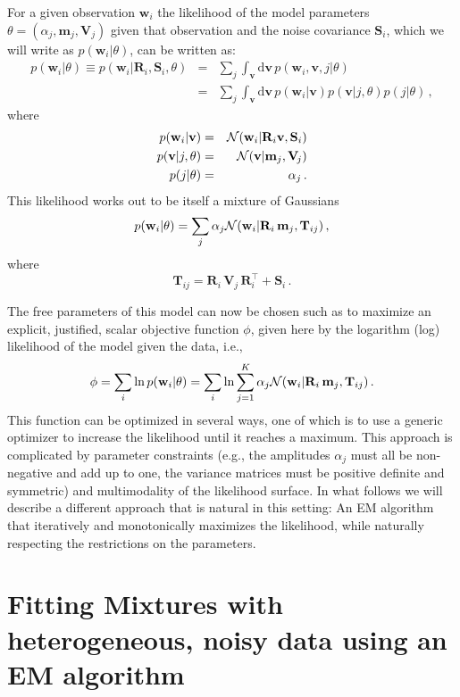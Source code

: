 \documentclass[aoas,preprint,authoryear,round]{imsart}
\newcommand{\eg}{e.g.}
\newcommand{\ie}{i.e.}
\newcommand{\normal}{{\cal N}}
\renewcommand{\vec}[1]{\mathbf{#1}} %
\newcommand{\mm}{\vec{m}}
\newcommand{\vv}{\vec{v}}
\newcommand{\ww}{\vec{w}}
\newcommand{\mmj}{\mm_j}
\newcommand{\wwi}{\ww_i}
\newcommand{\ten}[1]{\mathbf{#1}} %
\newcommand{\RR}{\ten{R}}
\renewcommand{\SS}{\ten{S}}
\newcommand{\TT}{\ten{T}}
\newcommand{\VV}{\ten{V}}
\newcommand{\RRi}{\RR_i}
\newcommand{\SSi}{\SS_i}
\newcommand{\VVj}{\VV_{\!j}} %
\newcommand{\TTij}{\TT_{ij}}
\newcommand{\T}{^{\scriptscriptstyle \top}}   %
\newcommand{\alphaj}{\alpha_j}
\begin{document}
For a given observation $\wwi$ the likelihood of the model parameters
$\theta=(\alphaj,\mmj,\VVj)$ given that observation and the noise
covariance $\SSi$, which we will write as $p(\wwi|\theta)$, can be
written as:
\begin{eqnarray}\displaystyle
p(\wwi|\theta) \equiv p(\wwi|\RRi,\SSi,\theta) &=&\sum_j\int_\vv \mathrm{d}\vv\, p(\wwi,\vv,j|\theta)\nonumber\\
&=& \sum_j\int_\vv \mathrm{d}\vv\, p(\wwi|\vv) p(\vv|j,\theta)p(j|\theta)\, ,
\end{eqnarray}
where
\begin{eqnarray}\displaystyle
p(\wwi|\vv) &=& \normal(\wwi|\RRi\vv,\SSi)\nonumber\\
p(\vv|j,\theta) &=& \normal(\vv|\mmj,\VVj)\nonumber\\
p(j|\theta) &=& \alphaj\, .
\end{eqnarray}
This likelihood works out to be itself a mixture of
Gaussians
\begin{equation}
p(\wwi|\theta) = \sum_j \alphaj \normal(\wwi|\RRi\,\mmj,\TTij)\, ,
\end{equation}
where
\begin{equation}
\TTij = \RRi\,\VVj\,\RRi\T + \SSi\, .
\end{equation}

The free parameters of this model can now be chosen such as to
maximize an explicit, justified, scalar objective function $\phi$,
given here by the logarithm (log) likelihood of the model given the
data, \ie,
\begin{equation}\label{eq:totallike}
\phi = \sum_i \ln p(\wwi|\theta) = \sum_i \ln \sum_{j=1}^K \alphaj \normal(\wwi|\RRi\,\mmj,\TTij)\, .
\end{equation}
This function can be optimized in several ways, one of which is to use
a generic optimizer to increase the likelihood until it reaches a
maximum. This approach is complicated by parameter constraints (\eg,
the amplitudes $\alphaj$ must all be non-negative and add up to one,
the variance matrices must be positive definite and symmetric) and
multimodality of the likelihood surface. In what follows we will
describe a different approach that is natural in this setting: An EM
algorithm that iteratively and monotonically maximizes the likelihood,
while naturally respecting the restrictions on the parameters.



\section{Fitting Mixtures with heterogeneous, noisy data using an EM algorithm}
\end{document}
